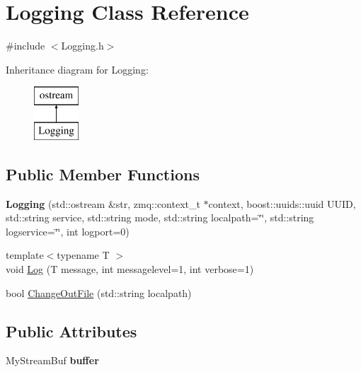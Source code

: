 \hypertarget{classLogging}{\section{Logging Class Reference}
\label{classLogging}
}


{\ttfamily \#include $<$Logging.\-h$>$}

Inheritance diagram for Logging\-:\begin{figure}[H]
\begin{center}
\leavevmode
\includegraphics[height=2.000000cm]{classLogging}
\end{center}
\end{figure}
\subsection*{Public Member Functions}
\begin{DoxyCompactItemize}
\item 
\hypertarget{classLogging_ae7cc7299c697019f273b75cbfefff848}{{\bfseries Logging} (std\-::ostream \&str, zmq\-::context\-\_\-t $\ast$context, boost\-::uuids\-::uuid U\-U\-I\-D, std\-::string service, std\-::string mode, std\-::string localpath=\char`\"{}\char`\"{}, std\-::string logservice=\char`\"{}\char`\"{}, int logport=0)}\label{classLogging_ae7cc7299c697019f273b75cbfefff848}

\item 
{\footnotesize template$<$typename T $>$ }\\void \hyperlink{classLogging_af7839ee68729b066da269cc012b1fcc9}{Log} (T message, int messagelevel=1, int verbose=1)
\item 
bool \hyperlink{classLogging_a7a0c89c152ad81fb41a849ed9d81e429}{Change\-Out\-File} (std\-::string localpath)
\end{DoxyCompactItemize}
\subsection*{Public Attributes}
\begin{DoxyCompactItemize}
\item 
\hypertarget{classLogging_a9622376d4c126c163334149cabc98bcc}{My\-Stream\-Buf {\bfseries buffer}}\label{classLogging_a9622376d4c126c163334149cabc98bcc}

\end{DoxyCompactItemize}


